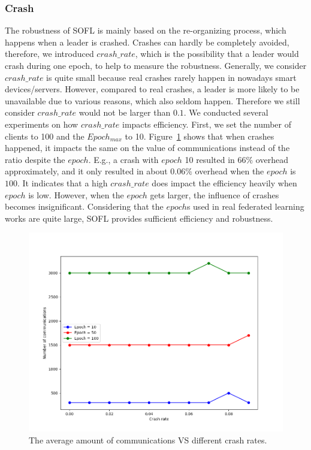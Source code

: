 \subsubsection{Crash}
The robustness of SOFL is mainly based on the re-organizing process, which happens when a leader is crashed. Crashes can hardly be completely avoided, therefore, we introduced $crash\_rate$, which is the possibility that a leader would crash during one epoch, to help to measure the robustness. Generally, we consider $crash\_rate$ is quite small because real crashes rarely happen in nowadays smart devices/servers. However, compared to real crashes, a leader is more likely to be unavailable due to various reasons, which also seldom happen. Therefore we still consider $crash\_rate$ would not be larger than $0.1$. We conducted several experiments on how $crash\_rate$ impacts efficiency. First, we set the number of clients to 100 and the $Epoch_{max}$ to 10. Figure~\ref{comm-crash} shows that when crashes happened, it impacts the same on the value of communications instead of the ratio despite the $epoch$. E.g., a crash with $epoch$ 10 resulted in $66\%$ overhead approximately, and it only resulted in about $0.06\%$ overhead when the $epoch$ is $100$. It indicates that a high $crash\_rate$ does impact the efficiency heavily when $epoch$ is low. However, when the $epoch$ gets larger, the influence of crashes becomes insignificant. Considering that the $epoch$s used in real federated learning works are quite large, SOFL provides sufficient efficiency and robustness.

\begin{figure}[!ht]
    \centering
    \includegraphics[width=\columnwidth]{img/comm-crash.png}
    \caption{The average amount of communications VS different crash rates.}
    \label{comm-crash}
\end{figure}

